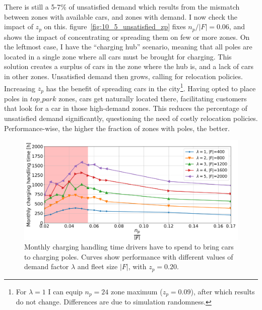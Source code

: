 There is still a 5-7\% of unsatisfied demand which results from the mismatch between zones with available cars, and zones with demand. I now check the impact of $z_p$ on this.
figure~\ref{fig:10_5_unsatisfied_zp} fixes $n_p/|F|=0.06$, and shows the impact of concentrating or spreading them on few or more zones. On the leftmost case, I have the ``charging hub'' scenario, meaning that all poles are located in a single zone where all cars must be brought for charging. This solution creates a surplus of cars in the zone where the hub is, and a lack of cars in other zones. Unsatisfied demand then grows, calling for relocation policies.
Increasing $z_p$ has the benefit of spreading cars in the city\footnote{For $\lambda=1$ I can equip $n_p=24$ zone maximum ($z_p=0.09$), after which results do not change. Differences are due to simulation randomness.}. Having opted to place poles in $top\_{park}$ zones, cars get naturally located there, facilitating customers that look for a car in those high-demand zones. This reduces the percentage of unsatisfied demand significantly, questioning the need of costly relocation policies. Performance-wise, the higher the fraction of zones with poles, the better.



\begin{figure}
\centering
\includegraphics[width=1.\linewidth]{fig/final/relocost_zp-20.pdf}
\caption{Monthly charging handling time drivers have to spend to bring cars to charging poles. Curves show performance with different values of demand factor $\lambda$ and fleet size $|F|$, with $z_p=0.20$.}
\label{fig:10_5_zp_relocost}
\end{figure}

